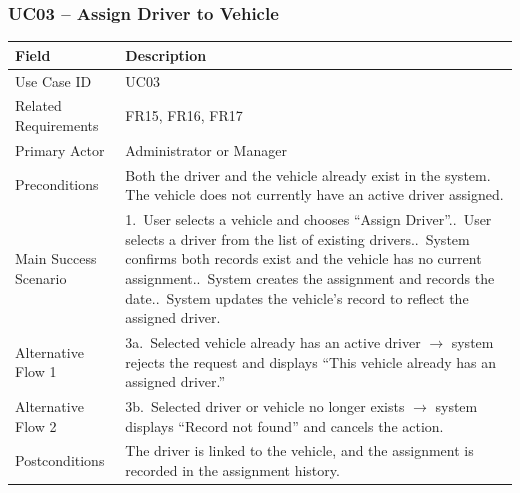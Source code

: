 \documentclass[11pt,a4paper]{article}
\begin{document}
\subsubsection*{UC03 -- Assign Driver to Vehicle}
\begin{longtable}{@{}p{3.2cm}p{11.3cm}@{}}
\toprule
Field & Description \\
\midrule
\endhead
Use Case ID & UC03 \\
Related Requirements & FR15, FR16, FR17 \\
Primary Actor & Administrator or Manager \\
Preconditions & Both the driver and the vehicle already exist in the
system. The vehicle does not currently have an active driver assigned. \\
Main Success Scenario &
1.\ User selects a vehicle and chooses ``Assign Driver''.\newline
2.\ User selects a driver from the list of existing drivers.\newline
3.\ System confirms both records exist and the vehicle has no current
assignment.\newline
4.\ System creates the assignment and records the date.\newline
5.\ System updates the vehicle's record to reflect the assigned driver. \\
Alternative Flow 1 & 3a.\ Selected vehicle already has an active driver
$\rightarrow$ system rejects the request and displays ``This vehicle
already has an assigned driver.'' \\
Alternative Flow 2 & 3b.\ Selected driver or vehicle no longer exists
$\rightarrow$ system displays ``Record not found'' and cancels the
action. \\
Postconditions & The driver is linked to the vehicle, and the assignment
is recorded in the assignment history. \\
\bottomrule
\end{longtable}
\end{document}
